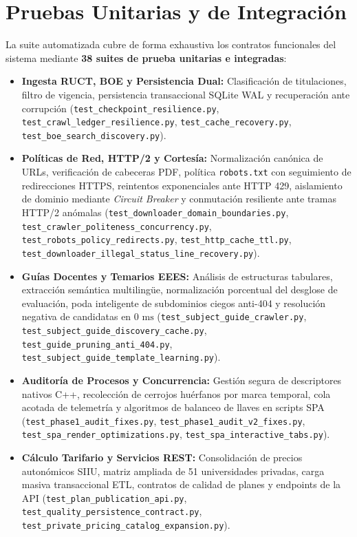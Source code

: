 \section{Pruebas Unitarias y de Integración}
La suite automatizada cubre de forma exhaustiva los contratos funcionales del sistema mediante \textbf{38 suites de prueba unitarias e integradas}:
\begin{itemize}
    \item \textbf{Ingesta RUCT, BOE y Persistencia Dual:} Clasificación de titulaciones, filtro de vigencia, persistencia transaccional SQLite WAL y recuperación ante corrupción (\nolinkurl{test_checkpoint_resilience.py}, \nolinkurl{test_crawl_ledger_resilience.py}, \nolinkurl{test_cache_recovery.py}, \nolinkurl{test_boe_search_discovery.py}).
    \item \textbf{Políticas de Red, HTTP/2 y Cortesía:} Normalización canónica de URLs, verificación de cabeceras PDF, política \texttt{robots.txt} con seguimiento de redirecciones HTTPS, reintentos exponenciales ante HTTP 429, aislamiento de dominio mediante \emph{Circuit Breaker} y conmutación resiliente ante tramas HTTP/2 anómalas (\nolinkurl{test_downloader_domain_boundaries.py}, \nolinkurl{test_crawler_politeness_concurrency.py}, \nolinkurl{test_robots_policy_redirects.py}, \nolinkurl{test_http_cache_ttl.py}, \nolinkurl{test_downloader_illegal_status_line_recovery.py}).
    \item \textbf{Guías Docentes y Temarios EEES:} Análisis de estructuras tabulares, extracción semántica multilingüe, normalización porcentual del desglose de evaluación, poda inteligente de subdominios ciegos anti-404 y resolución negativa de candidatas en $0\text{ ms}$ (\nolinkurl{test_subject_guide_crawler.py}, \nolinkurl{test_subject_guide_discovery_cache.py}, \nolinkurl{test_guide_pruning_anti_404.py}, \nolinkurl{test_subject_guide_template_learning.py}).
    \item \textbf{Auditoría de Procesos y Concurrencia:} Gestión segura de descriptores nativos C++, recolección de cerrojos huérfanos por marca temporal, cola acotada de telemetría y algoritmos de balanceo de llaves en scripts SPA (\nolinkurl{test_phase1_audit_fixes.py}, \nolinkurl{test_phase1_audit_v2_fixes.py}, \nolinkurl{test_spa_render_optimizations.py}, \nolinkurl{test_spa_interactive_tabs.py}).
    \item \textbf{Cálculo Tarifario y Servicios REST:} Consolidación de precios autonómicos SIIU, matriz ampliada de 51 universidades privadas, carga masiva transaccional ETL, contratos de calidad de planes y endpoints de la API (\nolinkurl{test_plan_publication_api.py}, \nolinkurl{test_quality_persistence_contract.py}, \nolinkurl{test_private_pricing_catalog_expansion.py}).

\end{itemize}
